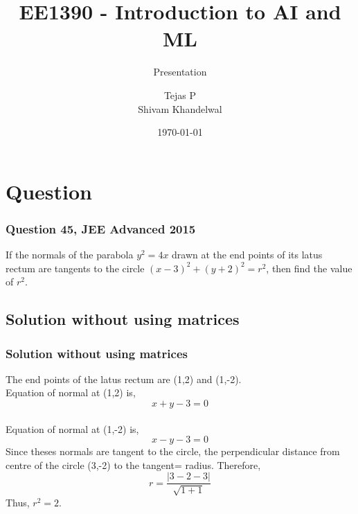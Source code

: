 \documentclass{beamer}
\title{EE1390 - Introduction to AI and ML}
\subtitle{Presentation}
\author{Tejas P \\ Shivam Khandelwal}
\institute{IIT Hyderabad}
\date{\today}
\begin{document}
 \begin{frame}
 \titlepage
 \end{frame}
 \section{Question}
 \begin{frame}
 \frametitle{Question 45, JEE Advanced 2015}
 If the normals of the parabola \(y^2=4x\) drawn at the end points of its latus rectum are tangents to the circle \((x-3)^2 + (y+2)^2 = r^2\), then find the value of \(r^2\).
 \end{frame}
 \begin{frame}
 \section{Solution without using matrices}
 \frametitle{Solution without using matrices}
 The end points of the latus rectum are (1,2) and (1,-2).\\Equation of normal at (1,2) is, 
 \begin{equation}
 x+y-3=0    
 \end{equation}
 \\ Equation of normal at (1,-2) is, 
  \begin{equation}
 x-y-3=0    
 \end{equation}
 Since theses normals are tangent to the circle, the perpendicular distance from centre of the circle (3,-2) to the tangent= radius. Therefore,
 \begin{equation}
 r=\frac{|3-2-3|}{\sqrt{1+1}}    
 \end{equation}
 Thus, $r^2=2$.
 \end{frame}
\end{document}

